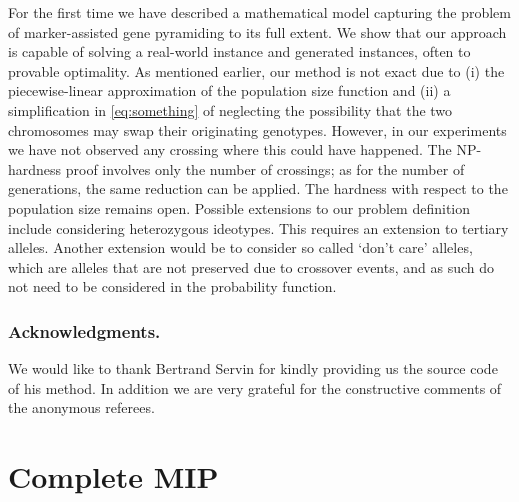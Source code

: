 \documentclass[runningheads]{llncs}
\begin{document}
For the first time we have described a mathematical model capturing the problem of marker-assisted gene pyramiding to its full extent. We show that our approach is capable of solving a real-world instance and generated instances, often to provable optimality.
As mentioned earlier, our method is not exact due to (i) the piecewise-linear approximation of the population size function and (ii) a simplification in \eqref{eq:something} of neglecting the possibility that the two chromosomes may swap their originating genotypes. However, in our experiments we have not observed any crossing where this could have happened. 
The NP-hardness proof involves only the number of crossings; as for the number of generations, the same reduction can be applied. The hardness with respect to the population size remains open. Possible extensions to our problem definition include considering heterozygous ideotypes. This requires an extension to tertiary alleles. Another extension would be to consider so called `don't care' alleles, which are alleles that are not preserved due to crossover events, and as such do not need to be considered in the probability function.

\subsubsection{Acknowledgments.} We would like to thank Bertrand Servin for kindly providing us the source code of his method. In addition we are very grateful for the constructive comments of the anonymous referees.




\appendix
 

\section{Complete MIP}
\label{sec:complete_mip}
\end{document}
